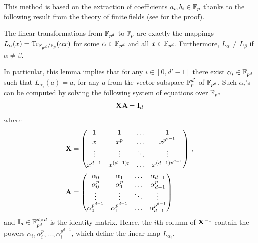   This method is based on the extraction of coefficients $a_i, b_i \in \mathbb{F}_p$ thanks to the following result from the theory of finite fields (see \cite[Theorem 2.24]{LN86} for the proof).
  \begin{lemma}\label{lem:extraction}
    The linear transformations from $\mathbb{F}_{p^d}$ to $\mathbb{F}_p$ are exactly the mappings $L_{\alpha}(x) = \mathrm{Tr}_{\mathbb{F}_{p^d}/\mathbb{F}_p}(\alpha x)$ for some $\alpha \in \mathbb{F}_{p^d}$ and all $x \in \mathbb{F}_{p^d}$.
    Furthermore, $L_{\alpha} \ne L_{\beta}$ if $\alpha \ne \beta$.
  \end{lemma}
  In particular, this lemma implies that for any $i \in [0,d'-1]$ there exist $\alpha_i \in \mathbb{F}_{p^d}$ such that $L_{\alpha_i}(a) = a_i$ for any $a$ from the vector subspace $\mathbb{F}_p^{d'}$ of $\mathbb{F}_{p^d}$.
  Such $\alpha_i$'s can be computed by solving the following system of equations over $\mathbb{F}_{p^d}$ 
  \begin{align*}
    \mathbf{X} \mathbf{A}
    =
    \mathbf{I}_{d}
  \end{align*}
  where
  \begin{align*}
  \mathbf{X} &= \begin{pmatrix}
      1       & 1       & \dots   & 1             \\
      x       & x^p     & \dots   & x^{p^{d-1}}   \\
      \vdots  & \vdots  & \ddots  & \vdots        \\
      x^{d-1}     & x^{(d-1)p}    & \dots   & x^{(d-1)p^{d-1}}  \\
    \end{pmatrix}\,,
    \\
    \mathbf{A} &= \begin{pmatrix}
      \alpha_0      & \alpha_1      & \dots   & \alpha_{d-1}      \\
      \alpha_0^{p}  & \alpha_1^{p}  & \dots   & \alpha_{d-1}^{p}  \\
      \vdots        & \vdots        & \ddots  & \vdots            \\
      \alpha_0^{p^{d-1}}  & \alpha_1^{p^{d-1}}  & \dots   & \alpha_{d-1}^{p^{d-1}}  \\
    \end{pmatrix}
  \end{align*}
  and $\mathbf{I}_d \in \mathbb{F}_{p^d}^{d \times d}$ is the identity matrix.
  Hence, the $i$th column of ${{\mathbf{X}}^{-1}}$ contain the powers $\alpha_i, \alpha_i^p, \dots, \alpha_i^{p^{d-1}}$, which define the linear map $L_{\alpha_i}$.


